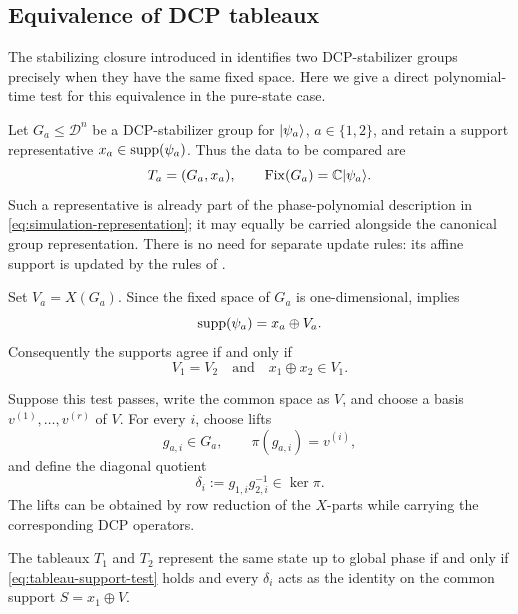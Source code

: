 \subsection{Equivalence of DCP tableaux}\label{app:tableau-equivalence}

The stabilizing closure introduced in
 identifies two DCP-stabilizer groups
precisely when they have the same fixed space. Here we give a direct
polynomial-time test for this equivalence in the pure-state case.

Let \(G_a\leq\mathcal D^n\) be a DCP-stabilizer group for
\(|\psi_a\rangle\), \(a\in\{1,2\}\), and retain a support representative
\(x_a\in\operatorname{supp}(\psi_a)\). Thus the data to be compared are
\begin{equation}
    T_a=(G_a,x_a),
    \qquad
    \operatorname{Fix}(G_a)=\mathbb{C}|\psi_a\rangle.
\end{equation}
Such a representative is already part of the phase-polynomial description
in \cref{eq:simulation-representation}; it may equally be carried
alongside the canonical group representation. There is no need for separate
update rules: its affine support is updated by the rules of
.

Set \(V_a=X(G_a)\). Since the fixed space of \(G_a\) is one-dimensional,
 implies
\begin{equation}
    \supp(\psi_a)=x_a\oplus V_a.
    \label{eq:tableau-affine-support}
\end{equation}
Consequently the supports agree if and only if
\begin{equation}
    V_1=V_2
    \quad\text{and}\quad
    x_1\oplus x_2\in V_1.
    \label{eq:tableau-support-test}
\end{equation}

Suppose this test passes, write the common space as \(V\), and choose a basis
\(v^{(1)},\ldots,v^{(r)}\) of \(V\). For every \(i\), choose lifts
\begin{equation}
    g_{a,i}\in G_a,
    \qquad
    \pi(g_{a,i})=v^{(i)},
\end{equation}
and define the diagonal quotient
\begin{equation}
    \delta_i:=g_{1,i}g_{2,i}^{-1}\in\ker\pi.
\end{equation}
The lifts can be obtained by row reduction of the \(X\)-parts while carrying
the corresponding DCP operators.

\begin{proposition}
    \label{prop:tableau-equivalence}
    The tableaux \(T_1\) and \(T_2\) represent the same state up to global
    phase if and only if \cref{eq:tableau-support-test} holds and every
    $\delta_i$ acts as the identity on the common support
    $S=x_1\oplus V$.
\end{proposition}

